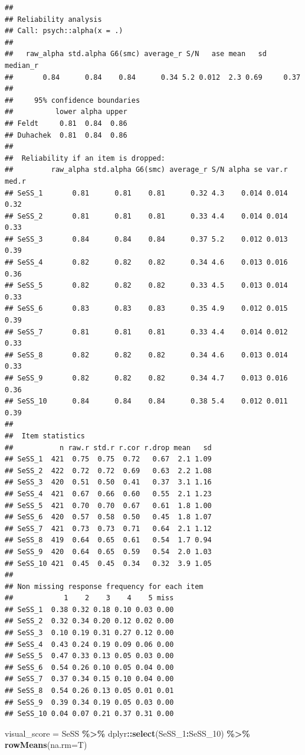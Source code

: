 \documentclass[
]{article}
\newenvironment{Shaded}{\begin{snugshade}}{\end{snugshade}}
\newcommand{\AttributeTok}[1]{\textcolor[rgb]{0.13,0.29,0.53}{#1}}
\newcommand{\FunctionTok}[1]{\textcolor[rgb]{0.13,0.29,0.53}{\textbf{#1}}}
\newcommand{\NormalTok}[1]{#1}
\newcommand{\OtherTok}[1]{\textcolor[rgb]{0.56,0.35,0.01}{#1}}
\newcommand{\SpecialCharTok}[1]{\textcolor[rgb]{0.81,0.36,0.00}{\textbf{#1}}}
\begin{document}
\begin{verbatim}
## 
## Reliability analysis   
## Call: psych::alpha(x = .)
## 
##   raw_alpha std.alpha G6(smc) average_r S/N   ase mean   sd median_r
##       0.84      0.84    0.84      0.34 5.2 0.012  2.3 0.69     0.37
## 
##     95% confidence boundaries 
##          lower alpha upper
## Feldt     0.81  0.84  0.86
## Duhachek  0.81  0.84  0.86
## 
##  Reliability if an item is dropped:
##         raw_alpha std.alpha G6(smc) average_r S/N alpha se var.r med.r
## SeSS_1       0.81      0.81    0.81      0.32 4.3    0.014 0.014  0.32
## SeSS_2       0.81      0.81    0.81      0.33 4.4    0.014 0.014  0.33
## SeSS_3       0.84      0.84    0.84      0.37 5.2    0.012 0.013  0.39
## SeSS_4       0.82      0.82    0.82      0.34 4.6    0.013 0.016  0.36
## SeSS_5       0.82      0.82    0.82      0.33 4.5    0.013 0.014  0.33
## SeSS_6       0.83      0.83    0.83      0.35 4.9    0.012 0.015  0.39
## SeSS_7       0.81      0.81    0.81      0.33 4.4    0.014 0.012  0.33
## SeSS_8       0.82      0.82    0.82      0.34 4.6    0.013 0.014  0.33
## SeSS_9       0.82      0.82    0.82      0.34 4.7    0.013 0.016  0.36
## SeSS_10      0.84      0.84    0.84      0.38 5.4    0.012 0.011  0.39
## 
##  Item statistics 
##           n raw.r std.r r.cor r.drop mean   sd
## SeSS_1  421  0.75  0.75  0.72   0.67  2.1 1.09
## SeSS_2  422  0.72  0.72  0.69   0.63  2.2 1.08
## SeSS_3  420  0.51  0.50  0.41   0.37  3.1 1.16
## SeSS_4  421  0.67  0.66  0.60   0.55  2.1 1.23
## SeSS_5  421  0.70  0.70  0.67   0.61  1.8 1.00
## SeSS_6  420  0.57  0.58  0.50   0.45  1.8 1.07
## SeSS_7  421  0.73  0.73  0.71   0.64  2.1 1.12
## SeSS_8  419  0.64  0.65  0.61   0.54  1.7 0.94
## SeSS_9  420  0.64  0.65  0.59   0.54  2.0 1.03
## SeSS_10 421  0.45  0.45  0.34   0.32  3.9 1.05
## 
## Non missing response frequency for each item
##            1    2    3    4    5 miss
## SeSS_1  0.38 0.32 0.18 0.10 0.03 0.00
## SeSS_2  0.32 0.34 0.20 0.12 0.02 0.00
## SeSS_3  0.10 0.19 0.31 0.27 0.12 0.00
## SeSS_4  0.43 0.24 0.19 0.09 0.06 0.00
## SeSS_5  0.47 0.33 0.13 0.05 0.03 0.00
## SeSS_6  0.54 0.26 0.10 0.05 0.04 0.00
## SeSS_7  0.37 0.34 0.15 0.10 0.04 0.00
## SeSS_8  0.54 0.26 0.13 0.05 0.01 0.01
## SeSS_9  0.39 0.34 0.19 0.05 0.03 0.00
## SeSS_10 0.04 0.07 0.21 0.37 0.31 0.00
\end{verbatim}

\begin{Shaded}
\begin{Highlighting}[]
\NormalTok{visual\_score }\OtherTok{=}\NormalTok{ SeSS }\SpecialCharTok{\%\textgreater{}\%}\NormalTok{ dplyr}\SpecialCharTok{::}\FunctionTok{select}\NormalTok{(SeSS\_1}\SpecialCharTok{:}\NormalTok{SeSS\_10) }\SpecialCharTok{\%\textgreater{}\%} \FunctionTok{rowMeans}\NormalTok{(}\AttributeTok{na.rm=}\NormalTok{T)}
\end{Highlighting}
\end{Shaded}
\end{document}
